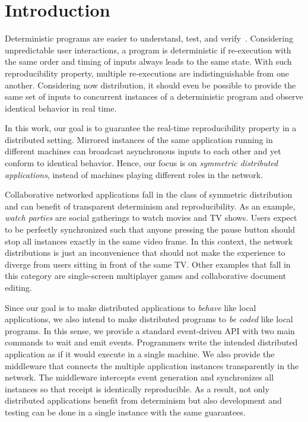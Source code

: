 \documentclass[sigplan,screen]{acmart}
\begin{document}
\section{Introduction}

Deterministic programs are easier to understand, test, and verify~\cite{det}.
Considering unpredictable user interactions, a program is deterministic if
re-execution with the same order and timing of inputs always leads to the same
state.
With such reproducibility property, multiple re-executions are
indistinguishable from one another.
Considering now distribution, it should even be possible to provide the same
set of inputs to concurrent instances of a deterministic program and observe
identical behavior in real time.

In this work, our goal is to guarantee the real-time reproducibility property
in a distributed setting.
Mirrored instances of the same application running in different machines can
broadcast asynchronous inputs to each other and yet conform to
identical behavior.
Hence, our focus is on \emph{symmetric distributed applications}, instead of
machines playing different roles in the network.

Collaborative networked applications fall in the class of symmetric
distribution and can benefit of transparent determinism and reproducibility.
As an example, \emph{watch parties} are social gatherings to watch movies and
TV shows.
Users expect to be perfectly synchronized such that anyone pressing the pause
button should stop all instances exactly in the same video frame.
In this context, the network distributions is just an inconvenience that should
not make the experience to diverge from users sitting in front of the same TV.
Other examples that fall in this category are single-screen multiplayer games
and collaborative document editing.

Since our goal is to make distributed applications to \emph{behave} like local
applications, we also intend to make distributed programs to \emph{be coded}
like local programs.
In this sense, we provide a standard event-driven API with two main commands
to wait and emit events.
Programmers write the intended distributed application as if it would execute
in a single machine.
We also provide the middleware that connects the multiple application instances
transparently in the network.
The middleware intercepts event generation and synchronizes all instances so
that receipt is identically reproducible.
As a result, not only distributed applications benefit from determinism but
also development and testing can be done in a single instance with the same
guarantees.
\end{document}
